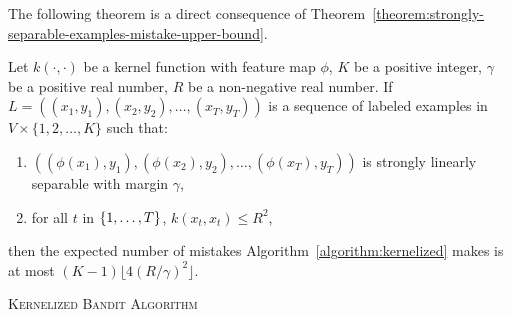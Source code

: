 The following theorem is a direct consequence of
Theorem~\ref{theorem:strongly-separable-examples-mistake-upper-bound}.

\begin{theorem}
\label{theorem:kernelized-upper-bound}
Let $k(\cdot, \cdot)$ be a kernel function with feature map $\phi$, $K$ be a positive
integer, $\gamma$ be a positive real number, $R$ be a non-negative real number. If
$L = ((x_1, y_1), (x_2, y_2), \dots, (x_T, y_T))$ is a sequence of labeled examples in
$V \times \{1,2,\dots,K\}$ such that:
\begin{enumerate}
  \item $((\phi(x_1), y_1), (\phi(x_2), y_2), \dots, (\phi(x_T), y_T))$ is strongly linearly separable with margin $\gamma$,
  \item for all $t$ in $\cbr{1,\ldots,T}$, $k(x_t,x_t) \le R^2$,
\end{enumerate}
then the
expected number of mistakes
Algorithm~\ref{algorithm:kernelized}
makes is at most $(K-1) \lfloor 4(R/\gamma)^2 \rfloor$.
\end{theorem}

\begin{algorithm}[h]
\caption{\textsc{Kernelized Bandit Algorithm}
\label{algorithm:kernelized}}
\begin{algorithmic}[1]
{
\ELSE
{}
\ENDIF
\ELSE
{}
\ELSE
{}
\ENDIF
\ENDIF
\ENDFOR
}
\end{algorithmic}
\end{algorithm}
